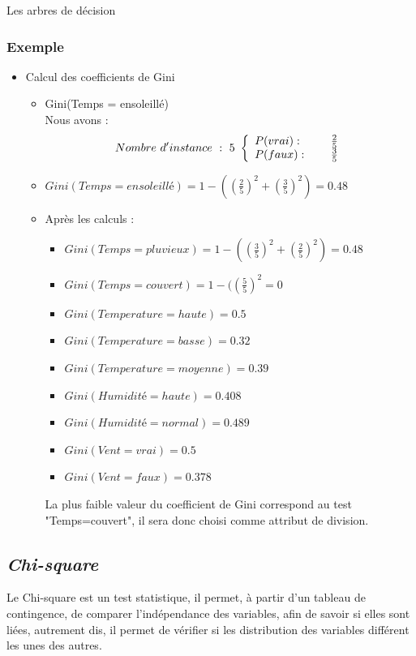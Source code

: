 \documentclass[a4paper, 11pt]{report}
\begin{document}
\begin{chapter}{Les arbres de décision}
\subsubsection*{Exemple}
\begin{itemize}
\item Calcul des coefficients de Gini
\begin{itemize}
\item Gini(Temps = ensoleillé)\\
Nous avons :\\
\[Nombre \ d'instance \ : \ 5 \ \left\{ 
\begin{array}{l l}
  P(vrai) : & \quad \text{ $\frac{2}{5}$}\\
  P(faux) : & \quad \text{ $\frac{3}{5}$}\\ 
  \end{array} \right. \]
\item $Gini(Temps=ensoleillé)= 1 - ((\frac{2}{5})^2 + (\frac{3}{5})^2)=0.48 $\\
\item Après les calculs : 
\begin{itemize}
\item $Gini(Temps = pluvieux) = 1 - ((\frac{3}{5})^2 + (\frac{2}{5})^2)=0.48 $
\item $Gini(Temps = couvert) = 1 - ((\frac{5}{5})^2 =0 $
\item $Gini(Temperature = haute) = 0.5 $
\item $Gini(Temperature = basse) = 0.32 $
\item $Gini(Temperature = moyenne) = 0.39 $
\item $Gini(Humidité = haute) = 0.408 $
\item $Gini(Humidité = normal) = 0.489 $
\item $Gini(Vent = vrai) = 0.5 $
\item $Gini(Vent = faux) = 0.378 $

\end{itemize}
La plus faible valeur du coefficient de Gini correspond au test "Temps=couvert", il sera donc choisi comme attribut de division.
\end{itemize}
\end{itemize}


\subsection*{\emph{Chi-square}}
Le Chi-square est un test statistique, il permet, à partir d'un tableau de contingence, de comparer l'indépendance des variables, afin de savoir si elles sont liées, autrement dis, il permet de vérifier si les distribution des variables différent les unes des autres.


\end{chapter}
\end{document}
